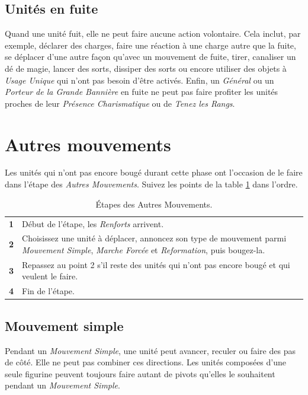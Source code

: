 \subsection{Unités en fuite}

Quand une unité fuit, elle ne peut faire aucune action volontaire. Cela inclut, par exemple, déclarer des charges, faire une réaction à une charge autre que la fuite, se déplacer d'une autre façon qu'avec un mouvement de fuite, tirer, canaliser un dé de magie, lancer des sorts, dissiper des sorts ou encore utiliser des objets à \emph{Usage Unique} qui n'ont pas besoin d'être activés. Enfin, un \emph{Général} ou un \emph{Porteur de la Grande Bannière} en fuite ne peut pas faire profiter les unités proches de leur \emph{Présence Charismatique} ou de \emph{Tenez les Rangs}.

\section{Autres mouvements}

Les unités qui n'ont pas encore bougé durant cette phase ont l'occasion de le faire dans l'étape des \emph{Autres Mouvements}. Suivez les points de la table \ref{table/autres_mouvements} dans l'ordre.

\begin{table}[!htbp]
\centering
\begin{tabular}{c|m{12cm}}
\textbf{1} & Début de l'étape, les \emph{Renforts} arrivent. \tabularnewline
\textbf{2} & Choisissez une unité à déplacer, annoncez son type de mouvement parmi \emph{Mouvement Simple}, \emph{Marche Forcée} et \emph{Reformation}, puis bougez-la. \tabularnewline
\textbf{3} & Repassez au point 2 s'il reste des unités qui n'ont pas encore bougé et qui veulent le faire. \tabularnewline
\textbf{4} & Fin de l'étape. \tabularnewline
\end{tabular}
\caption{\label{table/autres_mouvements}Étapes des Autres Mouvements.}
\end{table}

\subsection{Mouvement simple}

Pendant un \emph{Mouvement Simple}, une unité peut avancer, reculer ou faire des pas de côté. Elle ne peut pas combiner ces directions. Les unités composées d'une seule figurine peuvent toujours faire autant de pivots qu'elles le souhaitent pendant un \emph{Mouvement Simple}.

